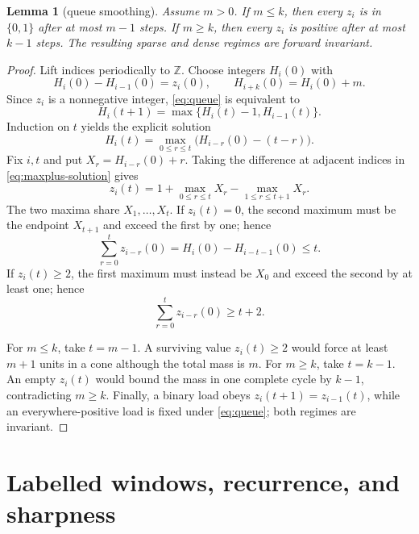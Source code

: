 \documentclass[a4paper,10pt]{amsart}
\newtheorem{lemma}[theorem]{Lemma}
\theoremstyle{definition}
\theoremstyle{remark}
\begin{document}
\begin{lemma}[queue smoothing]\label{lem:smoothing}
Assume $m>0$.  If $m\le k$, then every $z_i$ is in $\{0,1\}$ after at most
$m-1$ steps.  If $m\ge k$, then every $z_i$ is positive after at most $k-1$
steps.  The resulting sparse and dense regimes are forward invariant.
\end{lemma}

\begin{proof}
Lift indices periodically to $\mathbb Z$.  Choose integers $H_i(0)$ with
\[
 H_i(0)-H_{i-1}(0)=z_i(0),\qquad H_{i+k}(0)=H_i(0)+m.
\]
Since $z_i$ is a nonnegative integer, \eqref{eq:queue} is equivalent to
\begin{equation}\label{eq:maxplus-step}
 H_i(t+1)=\max\{H_i(t)-1,H_{i-1}(t)\}.
\end{equation}
Induction on $t$ yields the explicit solution
\begin{equation}\label{eq:maxplus-solution}
 H_i(t)=\max_{0\le r\le t}
       \bigl(H_{i-r}(0)-(t-r)\bigr).
\end{equation}
Fix $i,t$ and put $X_r=H_{i-r}(0)+r$.  Taking the difference at adjacent
indices in \eqref{eq:maxplus-solution} gives
\begin{equation}\label{eq:two-maxima}
 z_i(t)=1+\max_{0\le r\le t}X_r-
             \max_{1\le r\le t+1}X_r.
\end{equation}
The two maxima share $X_1,\ldots,X_t$.  If $z_i(t)=0$, the second maximum
must be the endpoint $X_{t+1}$ and exceed the first by one; hence
\[
 \sum_{r=0}^{t}z_{i-r}(0)=H_i(0)-H_{i-t-1}(0)\le t.
\]
If $z_i(t)\ge2$, the first maximum must instead be $X_0$ and exceed the
second by at least one; hence
\begin{equation}\label{eq:cones}
 \sum_{r=0}^{t}z_{i-r}(0)\ge t+2.
\end{equation}

For $m\le k$, take $t=m-1$.  A surviving value $z_i(t)\ge2$ would force at
least $m+1$ units in a cone although the total mass is $m$.  For $m\ge k$,
take $t=k-1$.  An empty $z_i(t)$ would bound the mass in one complete cycle
by $k-1$, contradicting $m\ge k$.  Finally, a binary load obeys
$z_i(t+1)=z_{i-1}(t)$, while an everywhere-positive load is fixed under
\eqref{eq:queue}; both regimes are invariant.
\end{proof}

\section{Labelled windows, recurrence, and sharpness}
\end{document}
